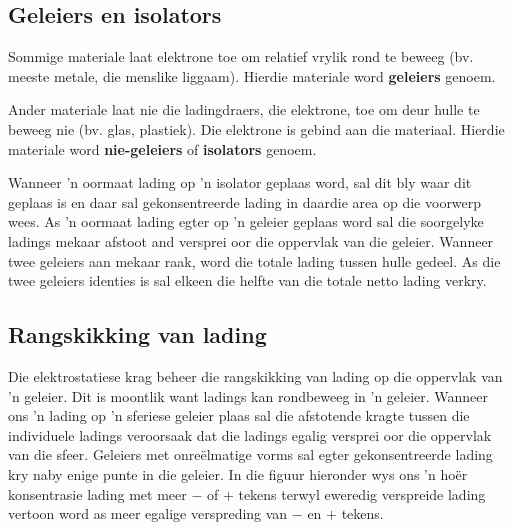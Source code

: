 \subsection*{Geleiers en isolators}
    \nopagebreak

Sommige materiale laat elektrone toe om relatief vrylik rond te beweeg (bv. meeste metale, die menslike liggaam). Hierdie materiale word \textbf{geleiers} genoem. \par
{}

Ander materiale laat nie die ladingdraers, die elektrone, toe om deur hulle te beweeg nie (bv. glas, plastiek). Die elektrone is gebind aan die materiaal. Hierdie materiale word \textbf{nie-geleiers} of \textbf{isolators} genoem. \par


Wanneer 'n oormaat lading op 'n isolator geplaas word, sal dit bly waar dit geplaas is en daar sal gekonsentreerde lading in daardie area op die voorwerp wees. As 'n oormaat lading egter op 'n geleier geplaas word sal die soorgelyke ladings mekaar afstoot and versprei oor die oppervlak van die geleier. Wanneer twee geleiers aan mekaar raak, word die totale lading tussen hulle gedeel. As die twee geleiers identies is sal elkeen die helfte van die totale netto lading verkry. \par

\subsection*{Rangskikking van lading}

Die elektrostatiese krag beheer die rangskikking van lading op die oppervlak van 'n geleier. Dit is moontlik want ladings kan rondbeweeg in 'n geleier. Wanneer ons 'n lading op 'n sferiese geleier plaas sal die afstotende kragte tussen die individuele ladings veroorsaak dat die ladings egalig versprei oor die oppervlak van die sfeer. Geleiers met onre\"elmatige vorms sal egter gekonsentreerde lading kry naby enige punte in die geleier. In die figuur hieronder wys ons 'n ho\"er konsentrasie lading met meer $-$ of $+$ tekens terwyl eweredig verspreide lading vertoon word as meer egalige verspreding van $-$ en $+$ tekens.\par

